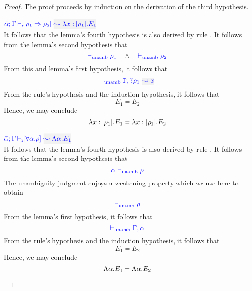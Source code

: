 \begin{proof}
The proof proceeds by induction on the derivation of the third hypothesis.
\begin{description}
\setlength{\itemsep}{1em}
\item[\fbox{\rref{R-IAbs}}]
\quad$\drres{\bar{\alpha}}{\tenv}{\rulet_1 \iarrow \rulet_2}{\abs{x}{\etrans{\rulet_1}}{E_1}}$ \\

It follows that the lemma's fourth hypothesis is also derived by rule
. It follows from the lemma's second hypothesis that 
\begin{equation*}
  {\color{blue}  \vdash_{\mathrm{unamb}}\rho_1}\quad\wedge\quad {\color{blue}  \vdash_{\mathrm{unamb}}\rho_2}
\end{equation*}
From this and lemma's first hypothesis, it follows that
\begin{equation*}
  \unambig{}{\tenv,\envi{\rulet_1}{x}}
\end{equation*}
From the rule's hypothesis and the induction hypothesis, it follows that
\begin{equation*}
  E_1 = E_2
\end{equation*}
Hence, we may conclude
\begin{equation*}
  \lambda x:|\rho_1|.E_1 =  \lambda x:|\rho_1|.E_2
\end{equation*}

\item[\fbox{\rref{R-TAbs}}]\quad$\drres{\bar{\alpha}}{\tenv}{\tall{\alpha}{\rulet}}{\Abs{\alpha}{E_1}}$ \\

It follows that the lemma's fourth hypothesis is also derived by rule
. It follows from the lemma's second hypothesis that 
\begin{equation*}
  {\color{blue} \alpha \vdash_{\mathrm{unamb}}\rho}
\end{equation*}
The unambiguity judgment enjoys a weakening property which we use here to obtain
\begin{equation*}
  {\color{blue}  \vdash_{\mathrm{unamb}}\rho}
\end{equation*}
From the lemma's first hypothesis, it follows that
\begin{equation*}
  {\color{blue}  \vdash_{\mathrm{unamb}}\Gamma, \alpha}
\end{equation*}
From the rule's hypothesis and the induction hypothesis, it follows that
\begin{equation*}
  E_1 = E_2
\end{equation*}
Hence, we may conclude
\begin{equation*}
  \Lambda \alpha. E_1 = \Lambda \alpha. E_2
\end{equation*}


\end{description}
\end{proof}
